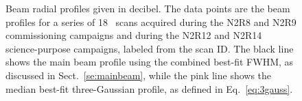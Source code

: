 \begin{figure}[!thbp]
  \caption[Stability of the beam profile]{{\lp Beam radial
    profiles given in decibel. %
    The data points are the beam profiles for a series of 18
    \bm\ scans acquired during the N2R8 and N2R9 commissioning campaigns and
    during the N2R12 and N2R14 science-purpose campaigns, labeled from the scan
    ID. The black line shows the main beam profile using the combined
    best-fit FWHM, as discussed in Sect.~\ref{se:mainbeam}, while the pink
    line shows the median best-fit three-Gaussian profile, as defined
    in Eq.~\ref{eq:3gauss}.}}
  \label{fig:beam_prof}
\end{figure}



